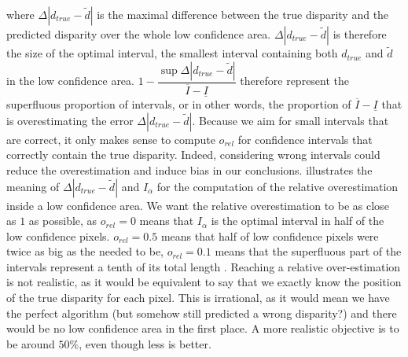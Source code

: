 where $\Delta|d_{true}-\tilde{d}|$ is the maximal difference between the true disparity and the predicted disparity over the whole low confidence area. $\Delta|d_{true}-\tilde{d}|$ is therefore the size of the optimal interval, \ie the smallest interval containing both $d_{true}$ and $\tilde{d}$ in the low confidence area. $1-\dfrac{\sup\Delta|d_{true}-\tilde{d}|}{\overline{I}-\underline{I}}$ therefore represent the superfluous proportion of intervals, or in other words, the proportion of $\overline{I}-\underline{I}$ that is overestimating the error $\Delta|d_{true}-\tilde{d}|$. Because we aim for small intervals that are correct, it only makes sense to compute $o_{rel}$ for confidence intervals that correctly contain the true disparity. Indeed, considering wrong intervals could reduce the overestimation and induce bias in our conclusions.  illustrates the meaning of $\Delta|d_{true}-\tilde{d}|$ and $I_\alpha$ for the computation of the relative overestimation inside a low confidence area. We want the relative overestimation to be as close as $1$ as possible, as $o_{rel}=0$ means that $I_\alpha$ is the optimal interval in half of the low confidence pixels. $o_{rel}=0.5$ means that half of low confidence pixels were twice as big as the needed to be, $o_{rel}=0.1$ means that the superfluous part of the intervals represent a tenth of its total length \etc{}. Reaching a relative over-estimation is not realistic, as it would be equivalent to say that we exactly know the position of the true disparity for each pixel. This is irrational, as it would mean we have the perfect algorithm (but somehow still predicted a wrong disparity?) and there would be no low confidence area in the first place. A more realistic objective is to be around $50\%$, even though less is better.

